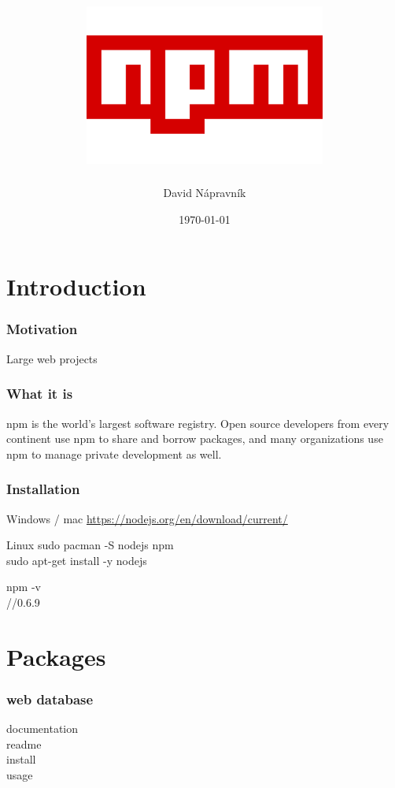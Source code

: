 \documentclass{beamer}
\title[Short title]{
	\includegraphics[scale=0.4]{npm_logo}	
} %
\author{David Nápravník} %
\institute[mff] %
{
Charles University \\ %
\medskip
\textit{ebrithil@nogare.cz} %
}
\date{\today} %
\begin{document}
\begin{frame}
\titlepage %
\end{frame}


\section{Introduction}

\begin{frame}
\frametitle{Motivation}
Large web projects
\end{frame}

\begin{frame}
\frametitle{What it is}
npm is the world’s largest software registry. Open source developers from every continent use npm to share and borrow packages, and many organizations use npm to manage private development as well.
\end{frame}

\begin{frame}
\frametitle{Installation}
\begin{block}{Windows / mac}
\url{https://nodejs.org/en/download/current/}
\end{block}

\begin{block}{Linux}
sudo pacman -S nodejs npm\\
sudo apt-get install -y nodejs
\end{block}

\begin{example}[verify]
npm -v\\
//0.6.9
\end{example}

\end{frame}


\section{Packages}

\begin{frame}
\frametitle{web database}
documentation\\
readme\\
install\\
usage	
\end{frame}
\end{document}
